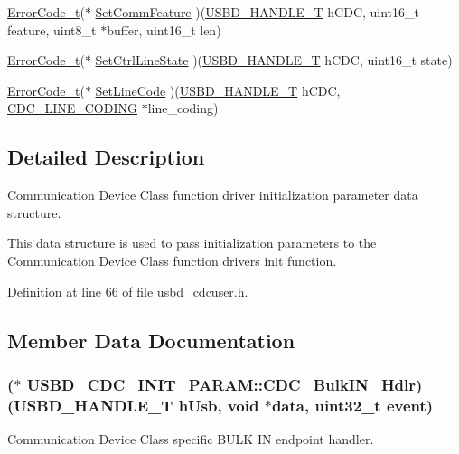 \begin{DoxyCompactItemize}
\hyperlink{error_8h_a905255056c349318139d94aa4523d516}{Error\+Code\+\_\+t}($\ast$ \hyperlink{structUSBD__CDC__INIT__PARAM_a1e5fcd48c821d9af9b4a422e9847d636}{Set\+Comm\+Feature} )(\hyperlink{group__USBD__Core_gafdbb2204d929cb9d75736bd2b42342ac}{U\+S\+B\+D\+\_\+\+H\+A\+N\+D\+L\+E\+\_\+T} h\+C\+DC, uint16\+\_\+t feature, uint8\+\_\+t $\ast$buffer, uint16\+\_\+t len)
\item 
\hyperlink{error_8h_a905255056c349318139d94aa4523d516}{Error\+Code\+\_\+t}($\ast$ \hyperlink{structUSBD__CDC__INIT__PARAM_ab73f0f1c6bf0957cb72bb57a481fc847}{Set\+Ctrl\+Line\+State} )(\hyperlink{group__USBD__Core_gafdbb2204d929cb9d75736bd2b42342ac}{U\+S\+B\+D\+\_\+\+H\+A\+N\+D\+L\+E\+\_\+T} h\+C\+DC, uint16\+\_\+t state)
\item 
\hyperlink{error_8h_a905255056c349318139d94aa4523d516}{Error\+Code\+\_\+t}($\ast$ \hyperlink{structUSBD__CDC__INIT__PARAM_aa2572724619feddd267d35ab6014f379}{Set\+Line\+Code} )(\hyperlink{group__USBD__Core_gafdbb2204d929cb9d75736bd2b42342ac}{U\+S\+B\+D\+\_\+\+H\+A\+N\+D\+L\+E\+\_\+T} h\+C\+DC, \hyperlink{usbd__cdc_8h_a1d66ffafad206be2563c72cb972fbf52}{C\+D\+C\+\_\+\+L\+I\+N\+E\+\_\+\+C\+O\+D\+I\+NG} $\ast$line\+\_\+coding)
\end{DoxyCompactItemize}


\subsection{Detailed Description}
Communication Device Class function driver initialization parameter data structure. 

This data structure is used to pass initialization parameters to the Communication Device Class function driver\textquotesingle{}s init function. 

Definition at line 66 of file usbd\+\_\+cdcuser.\+h.



\subsection{Member Data Documentation}
\subsubsection[{\texorpdfstring{C\+D\+C\+\_\+\+Bulk\+I\+N\+\_\+\+Hdlr}{CDC_BulkIN_Hdlr}}]{($\ast$ U\+S\+B\+D\+\_\+\+C\+D\+C\+\_\+\+I\+N\+I\+T\+\_\+\+P\+A\+R\+A\+M\+::\+C\+D\+C\+\_\+\+Bulk\+I\+N\+\_\+\+Hdlr) ({\bf U\+S\+B\+D\+\_\+\+H\+A\+N\+D\+L\+E\+\_\+T} h\+Usb, void $\ast$data, uint32\+\_\+t event)}\hypertarget{structUSBD__CDC__INIT__PARAM_ac6a85d108817d7ba7e56934df8c80b81}{}\label{structUSBD__CDC__INIT__PARAM_ac6a85d108817d7ba7e56934df8c80b81}
Communication Device Class specific B\+U\+LK IN endpoint handler.

